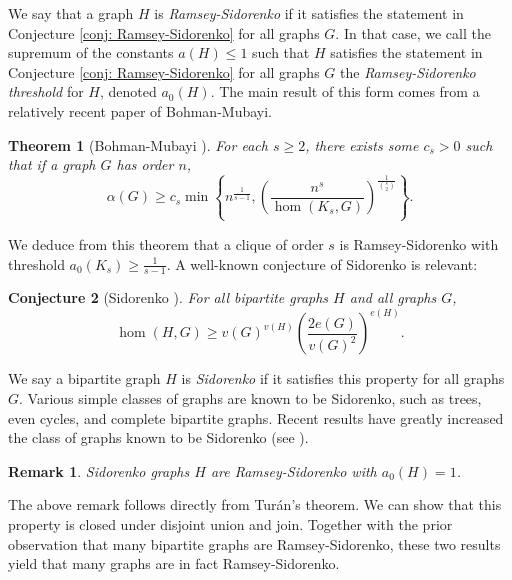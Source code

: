 \documentclass[12pt]{article}
\newtheorem{theorem}{Theorem}
\newtheorem{conjecture}[theorem]{Conjecture}
\newtheorem{remark}{Remark}
\begin{document}
We say that a graph $H$ is \textit{Ramsey-Sidorenko} if it satisfies the statement in Conjecture \ref{conj: Ramsey-Sidorenko} for all graphs $G$. In that case, we call the supremum of the constants $a(H)\leq 1$ such that $H$ satisfies the statement in Conjecture \ref{conj: Ramsey-Sidorenko} for all graphs $G$ the \textit{Ramsey-Sidorenko threshold} for $H$, denoted $a_0(H)$. The main result of this form comes from a relatively recent paper of Bohman-Mubayi.
\begin{theorem}[Bohman-Mubayi \cite{bohman2018}]
\label{thm: clique-independence}
    For each $s\geq2$, there exists some $c_s>0$ such that if a graph $G$ has order $n$,
\[
\alpha(G)\geq  c_s\min\left\{n^\frac{1}{s-1},\left(\frac{n^s}{\hom(K_s,G)}\right)^{\frac{1}{\binom{s}{2}}}\right\}.
\]
\end{theorem}
We deduce from this theorem that a clique of order $s$ is Ramsey-Sidorenko with threshold $a_0(K_s)\geq\frac{1}{s-1}$. A well-known conjecture of Sidorenko is relevant:
\begin{conjecture}[Sidorenko \cite{sidorenko1992}]
\label{conj: Sidorenko}
    For all bipartite graphs $H$ and all graphs $G$,
$$\hom(H,G)\geq v(G)^{v(H)}\left(\frac{2e(G)}{v(G)^2}\right)^{e(H)}.$$
\end{conjecture}
We say a bipartite graph $H$ is \textit{Sidorenko} if it satisfies this property for all graphs $G$. Various simple classes of graphs are known to be Sidorenko, such as trees, even cycles, and complete bipartite graphs. Recent results have greatly increased the class of graphs known to be Sidorenko (see \cite{conlon2018}).



\begin{remark}
    Sidorenko graphs $H$ are Ramsey-Sidorenko with $a_0(H)=1$.
\end{remark}

The above remark follows directly from Tur\'an's theorem. We can show that this property is closed under disjoint union and join. Together with the prior observation that many bipartite graphs are Ramsey-Sidorenko, these two results yield that many graphs are in fact Ramsey-Sidorenko.
\end{document}
